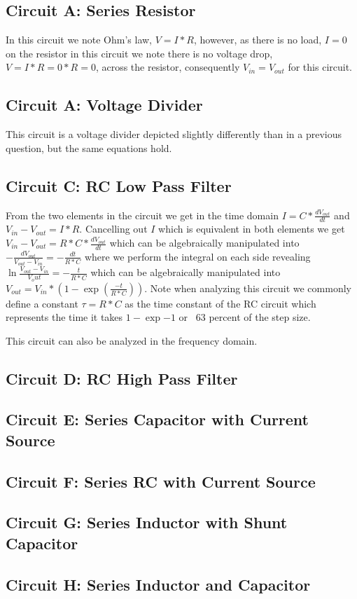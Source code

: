 \documentclass[main.tex]{subfiles}
\begin{document}
\subsection{Circuit A: Series Resistor}
In this circuit we note Ohm's law, $V = I * R$, however, as there is no load, $I=0$ on the resistor in this circuit we note there is no voltage drop, $V=I*R=0*R=0$, across the resistor, consequently $V_{in} = V_{out}$ for this circuit. 


\subsection{Circuit A: Voltage Divider}
This circuit is a voltage divider depicted slightly differently than in a previous question, but the same equations hold. 


\subsection{Circuit C: RC Low Pass Filter}
From the two elements in the circuit we get in the time domain $I = C * \frac{dV_{out}}{dt}$ and $V_{in} - V_{out} = I * R$. Cancelling out $I$ which is equivalent in both elements we get $V_{in} - V_{out} = R * C * \frac{dV_{out}}{dt}$ which can be algebraically manipulated into $-\frac{dV_{out}}{V_{out}-V_{in}} = -\frac{dt}{R*C}$ where we perform the integral on each side revealing $\ln{\frac{V_{out}-V_{in}}{V_out}}=-\frac{t}{R*C}$ which can be algebraically manipulated into $V_{out}=V_{in}*(1-\exp(\frac{-t}{R*C}))$. Note when analyzing this circuit we commonly define a constant $\tau = R * C$ as the time constant of the RC circuit which represents the time it takes $1-\exp{-1}$ or ~63 percent of the step size. 


This circuit can also be analyzed in the frequency domain. 



\subsection{Circuit D: RC High Pass Filter}

\subsection{Circuit E: Series Capacitor with Current Source}

\subsection{Circuit F: Series RC with Current Source}

\subsection{Circuit G: Series Inductor with Shunt Capacitor}

\subsection{Circuit H: Series Inductor and Capacitor}
\end{document}
